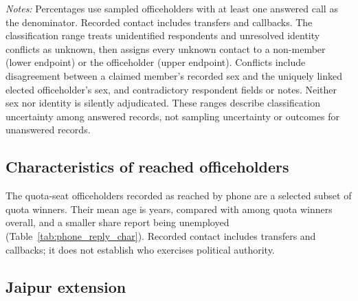\begin{table}[!htbp]
    \centering
    \caption{Officeholder Contact: Sensitivity to Respondent Classification}
    \label{tab:phone_identity_sensitivity}
    
    \parbox{0.95\textwidth}{\scriptsize
        \emph{Notes:} Percentages use sampled officeholders with at least one answered call as the denominator. Recorded contact includes transfers and callbacks. The classification range treats unidentified respondents and unresolved identity conflicts as unknown, then assigns every unknown contact to a non-member (lower endpoint) or the officeholder (upper endpoint). Conflicts include disagreement between a claimed member's recorded sex and the uniquely linked elected officeholder's sex, and contradictory respondent fields or notes. Neither sex nor identity is silently adjudicated. These ranges describe classification uncertainty among answered records, not sampling uncertainty or outcomes for unanswered records.
    }
\end{table}

\FloatBarrier

\subsection{Characteristics of reached officeholders}

The \phoneQuotaMemberN{} quota-seat officeholders recorded as reached by phone are a selected subset of quota winners. Their mean age is \phoneRespondentAge{} years, compared with \allAgeQuota{} among quota winners overall, and a smaller share report being unemployed (Table~\ref{tab:phone_reply_char}). Recorded contact includes transfers and callbacks; it does not establish who exercises political authority.



\FloatBarrier

\clearpage
\subsection{Jaipur extension}

